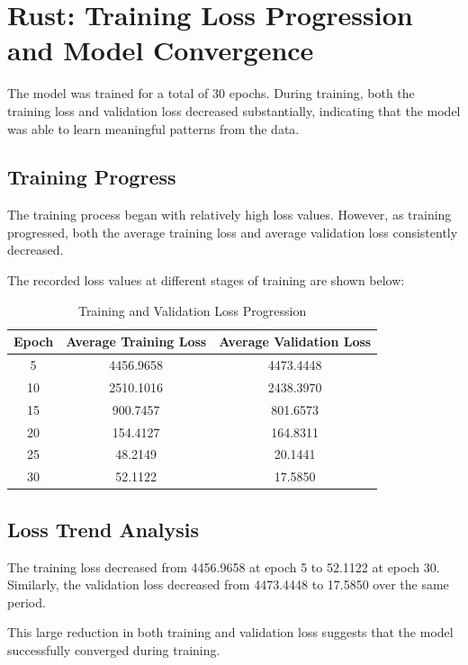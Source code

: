 \documentclass[12pt]{article}
\begin{document}
\section{Rust: Training Loss Progression and Model Convergence}

The model was trained for a total of 30 epochs. During training, both the training loss and validation loss decreased substantially, indicating that the model was able to learn meaningful patterns from the data.

\subsection{Training Progress}

The training process began with relatively high loss values. However, as training progressed, both the average training loss and average validation loss consistently decreased.

The recorded loss values at different stages of training are shown below:

\begin{table}[h]
\centering
\caption{Training and Validation Loss Progression}
\begin{tabular}{|c|c|c|}
\hline
\textbf{Epoch} & \textbf{Average Training Loss} & \textbf{Average Validation Loss} \\
\hline
5  & 4456.9658 & 4473.4448 \\
10 & 2510.1016 & 2438.3970 \\
15 & 900.7457  & 801.6573 \\
20 & 154.4127  & 164.8311 \\
25 & 48.2149   & 20.1441 \\
30 & 52.1122   & 17.5850 \\
\hline
\end{tabular}
\label{tab:loss_progression}
\end{table}

\subsection{Loss Trend Analysis}

The training loss decreased from 4456.9658 at epoch 5 to 52.1122 at epoch 30. Similarly, the validation loss decreased from 4473.4448 to 17.5850 over the same period.

This large reduction in both training and validation loss suggests that the model successfully converged during training.
\end{document}
